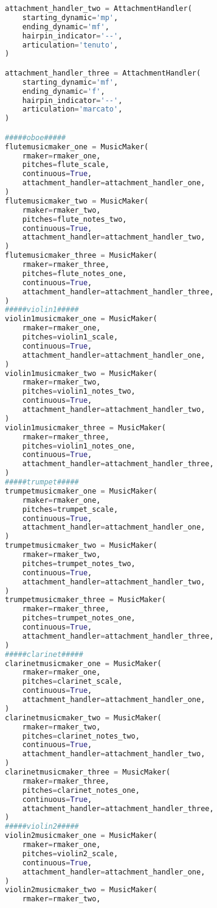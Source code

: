 \begin{lstlisting}[language=Python, caption=Tianshu Segment\_III]
attachment_handler_two = AttachmentHandler(
    starting_dynamic='mp',
    ending_dynamic='mf',
    hairpin_indicator='--',
    articulation='tenuto',
)

attachment_handler_three = AttachmentHandler(
    starting_dynamic='mf',
    ending_dynamic='f',
    hairpin_indicator='--',
    articulation='marcato',
)

#####oboe#####
flutemusicmaker_one = MusicMaker(
    rmaker=rmaker_one,
    pitches=flute_scale,
    continuous=True,
    attachment_handler=attachment_handler_one,
)
flutemusicmaker_two = MusicMaker(
    rmaker=rmaker_two,
    pitches=flute_notes_two,
    continuous=True,
    attachment_handler=attachment_handler_two,
)
flutemusicmaker_three = MusicMaker(
    rmaker=rmaker_three,
    pitches=flute_notes_one,
    continuous=True,
    attachment_handler=attachment_handler_three,
)
#####violin1#####
violin1musicmaker_one = MusicMaker(
    rmaker=rmaker_one,
    pitches=violin1_scale,
    continuous=True,
    attachment_handler=attachment_handler_one,
)
violin1musicmaker_two = MusicMaker(
    rmaker=rmaker_two,
    pitches=violin1_notes_two,
    continuous=True,
    attachment_handler=attachment_handler_two,
)
violin1musicmaker_three = MusicMaker(
    rmaker=rmaker_three,
    pitches=violin1_notes_one,
    continuous=True,
    attachment_handler=attachment_handler_three,
)
#####trumpet#####
trumpetmusicmaker_one = MusicMaker(
    rmaker=rmaker_one,
    pitches=trumpet_scale,
    continuous=True,
    attachment_handler=attachment_handler_one,
)
trumpetmusicmaker_two = MusicMaker(
    rmaker=rmaker_two,
    pitches=trumpet_notes_two,
    continuous=True,
    attachment_handler=attachment_handler_two,
)
trumpetmusicmaker_three = MusicMaker(
    rmaker=rmaker_three,
    pitches=trumpet_notes_one,
    continuous=True,
    attachment_handler=attachment_handler_three,
)
#####clarinet#####
clarinetmusicmaker_one = MusicMaker(
    rmaker=rmaker_one,
    pitches=clarinet_scale,
    continuous=True,
    attachment_handler=attachment_handler_one,
)
clarinetmusicmaker_two = MusicMaker(
    rmaker=rmaker_two,
    pitches=clarinet_notes_two,
    continuous=True,
    attachment_handler=attachment_handler_two,
)
clarinetmusicmaker_three = MusicMaker(
    rmaker=rmaker_three,
    pitches=clarinet_notes_one,
    continuous=True,
    attachment_handler=attachment_handler_three,
)
#####violin2#####
violin2musicmaker_one = MusicMaker(
    rmaker=rmaker_one,
    pitches=violin2_scale,
    continuous=True,
    attachment_handler=attachment_handler_one,
)
violin2musicmaker_two = MusicMaker(
    rmaker=rmaker_two,

\end{lstlisting}
